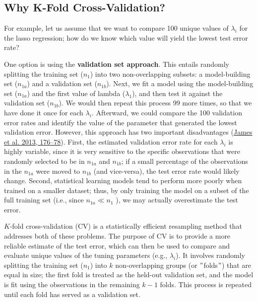 \documentclass{book}
\begin{document}
\hypertarget{why-k-fold-cross-validation}{%
\subsection{Why K-Fold Cross-Validation?}\label{why-k-fold-cross-validation}}

For example, let us assume that we want to compare 100 unique values of
\(\lambda _{i}\) for the lasso regression; how do we know which value will
yield the lowest test error rate?

One option is using the \textbf{validation set approach}. This entails
randomly splitting the training set (\(n_{1}\)) into two non-overlapping
subsets: a model-building set (\(n_{1a}\)) and a validation set (\(n_{1b}\)).
Next, we fit a model using the model-building set (\(n_{1a}\)) and the first
value of lambda (\(\lambda _{1}\)), and then test it against the validation
set (\(n_{1b}\)). We would then repeat this process 99 more times, so that we
have done it once for each \(\lambda _{i}\). Afterward, we could compare the
100 validation error rates and identify the value of the parameter that
generated the lowest validation error. However, this approach has two
important disadvantages (\protect\hyperlink{ref-james2013a}{James et al. 2013,
176--78}). First, the estimated validation error rate for each
\(\lambda _{i}\) is highly variable, since it is very sensitive to the
specific observations that were randomly selected to be in \(n_{1a}\) and
\(n_{1b}\); if a small percentage of the observations in the \(n_{1a}\) were
moved to \(n_{1b}\) (and vice-versa), the test error rate would likely change.
Second, statistical learning models tend to perform more poorly when trained
on a smaller dataset; thus, by only training the model on a subset of the full
training set (i.e., since \(n_{1a} \ll n_{1}\) ), we may actually overestimate
the test error.

\(K\)-fold cross-validation (CV) is a statistically efficient resampling
method that addresses both of these problems. The purpose of CV is to provide
a more reliable estimate of the test error, which can then be used to compare
and evaluate unique values of the tuning parameters (e.g., \(\lambda _{i}\)).
It involves randomly splitting the training set (\(n_{1}\)) into \(k\)
non-overlapping groups (or \("\)folds\("\)) that are equal in size; the first
fold is treated as the held-out validation set, and the model is fit using the
observations in the remaining \(k-1\) folds. This process is repeated until
each fold has served as a validation set.
\end{document}
